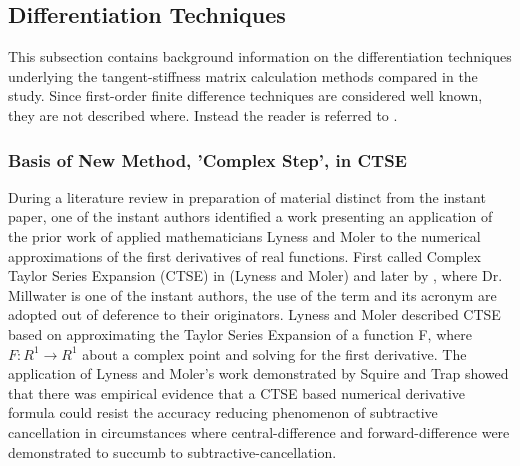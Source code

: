 \documentclass[preprint,12pt]{elsarticle}
\begin{document}
\subsection{Differentiation Techniques}

This subsection contains background information on the differentiation techniques underlying the
tangent-stiffness matrix calculation methods compared in the study. Since first-order finite
difference techniques are considered well known, they are not described where. Instead the
reader is referred to \cite[Chap. 4.1.3]{chapra2010}.

\subsubsection{Basis of New Method, 'Complex Step', in CTSE}  

During a literature review in preparation of material distinct from the instant paper, one of the
instant authors identified a work presenting an application of the prior work of applied
mathematicians Lyness and Moler to the numerical approximations of the first derivatives of real
functions. First called Complex Taylor Series Expansion (CTSE) in (Lyness and Moler) and later by
\cite{voorhees2011complex}, where Dr. Millwater is one of the  instant authors, the use of the term and
its acronym are adopted out of deference to their  originators. Lyness and Moler described CTSE
based on  approximating the Taylor Series Expansion of a function F, where $F:R^1 \rightarrow R^1$  about a
complex point and solving for the first derivative. The application of Lyness and Moler's work
demonstrated by Squire and Trap showed that there was empirical evidence that a CTSE based numerical
derivative formula could resist the accuracy reducing phenomenon of subtractive cancellation in
circumstances where central-difference and forward-difference were  demonstrated to succumb to
subtractive-cancellation.       
 
\end{document}
